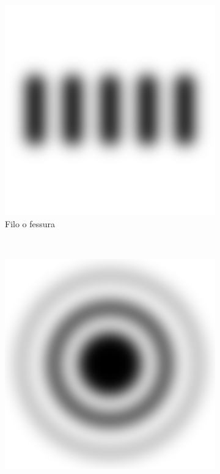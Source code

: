 \begin{figure}[t]
    \centering
    \begin{subfigure}[b]{0.3\textwidth}
        \includegraphics[width=\textwidth]{f1.png}
        \caption{Filo o fessura}
        \label{fig:ff}
    \end{subfigure}%
    ~ %
    \begin{subfigure}[b]{0.3\textwidth}
        \includegraphics[width=\textwidth]{f2.png}

\end{subfigure}
\end{figure}
